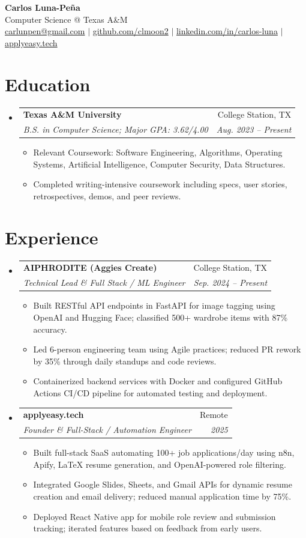 \documentclass[letterpaper,11pt]{article}
\makeatletter
\newcommand{\resumeItem}[1]{
  \item\small{{#1 \vspace{-2pt}}}
}
\newcommand{\resumeSubheading}[4]{
  \vspace{-2pt}\item
    \begin{tabular*}{0.97\textwidth}[t]{l@{\extracolsep{\fill}}r}
      \textbf{#1} & #2 \\
      \textit{\small#3} & \textit{\small #4} \\
    \end{tabular*}\vspace{-7pt}
}
\newcommand{\resumeSubHeadingListStart}{\begin{itemize}[leftmargin=0.15in, label={}]}
\newcommand{\resumeSubHeadingListEnd}{\end{itemize}}
\newcommand{\resumeItemListStart}{\begin{itemize}}
\newcommand{\resumeItemListEnd}{\end{itemize}\vspace{-5pt}}
\makeatother
\begin{document}
\begin{center}
  \textbf{\Huge Carlos Luna-Pe\~na} \\
  \vspace{1pt}
  Computer Science @ Texas A\&M \\
  \vspace{1pt}
  \href{mailto:carlunpen@gmail.com}{carlunpen@gmail.com} $|$ 
  \href{https://github.com/clmoon2}{github.com/clmoon2} $|$ 
  \href{https://linkedin.com/in/carlos-luna}{linkedin.com/in/carlos-luna} $|$ 
  \href{https://applyeasy.tech}{applyeasy.tech}
\end{center}

\section{Education}
\resumeSubHeadingListStart
  \resumeSubheading
    {Texas A\&M University}{College Station, TX}
    {B.S. in Computer Science; Major GPA: 3.62/4.00}{Aug. 2023 -- Present}
    \resumeItemListStart
      \resumeItem{Relevant Coursework: Software Engineering, Algorithms, Operating Systems, Artificial Intelligence, Computer Security, Data Structures.}
      \resumeItem{Completed writing-intensive coursework including specs, user stories, retrospectives, demos, and peer reviews.}
    \resumeItemListEnd
\resumeSubHeadingListEnd

\section{Experience}
\resumeSubHeadingListStart
  \resumeSubheading
    {AIPHRODITE (Aggies Create)}{College Station, TX}
    {Technical Lead \& Full Stack / ML Engineer}{Sep. 2024 -- Present}
    \resumeItemListStart
      \resumeItem{Built RESTful API endpoints in FastAPI for image tagging using OpenAI and Hugging Face; classified 500+ wardrobe items with 87\% accuracy.}
      \resumeItem{Led 6-person engineering team using Agile practices; reduced PR rework by 35\% through daily standups and code reviews.}
      \resumeItem{Containerized backend services with Docker and configured GitHub Actions CI/CD pipeline for automated testing and deployment.}
    \resumeItemListEnd

  \resumeSubheading
    {applyeasy.tech}{Remote}
    {Founder \& Full-Stack / Automation Engineer}{2025}
    \resumeItemListStart
      \resumeItem{Built full-stack SaaS automating 100+ job applications/day using n8n, Apify, LaTeX resume generation, and OpenAI-powered role filtering.}
      \resumeItem{Integrated Google Slides, Sheets, and Gmail APIs for dynamic resume creation and email delivery; reduced manual application time by 75\%.}
      \resumeItem{Deployed React Native app for mobile role review and submission tracking; iterated features based on feedback from early users.}
    \resumeItemListEnd
\resumeSubHeadingListEnd
\end{document}
